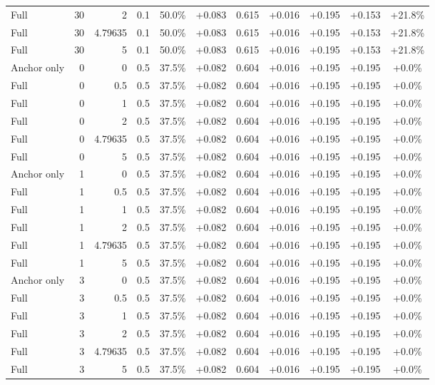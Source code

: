 \begin{table}[htbp]
\begin{tabular}{lrrrccccccc}
Full & 30 & 2 & 0.1 & 50.0\% & +0.083 & 0.615 & +0.016 & +0.195 & +0.153 & +21.8\% \\
Full & 30 & 4.79635 & 0.1 & 50.0\% & +0.083 & 0.615 & +0.016 & +0.195 & +0.153 & +21.8\% \\
Full & 30 & 5 & 0.1 & 50.0\% & +0.083 & 0.615 & +0.016 & +0.195 & +0.153 & +21.8\% \\
Anchor only & 0 & 0 & 0.5 & 37.5\% & +0.082 & 0.604 & +0.016 & +0.195 & +0.195 & +0.0\% \\
Full & 0 & 0.5 & 0.5 & 37.5\% & +0.082 & 0.604 & +0.016 & +0.195 & +0.195 & +0.0\% \\
Full & 0 & 1 & 0.5 & 37.5\% & +0.082 & 0.604 & +0.016 & +0.195 & +0.195 & +0.0\% \\
Full & 0 & 2 & 0.5 & 37.5\% & +0.082 & 0.604 & +0.016 & +0.195 & +0.195 & +0.0\% \\
Full & 0 & 4.79635 & 0.5 & 37.5\% & +0.082 & 0.604 & +0.016 & +0.195 & +0.195 & +0.0\% \\
Full & 0 & 5 & 0.5 & 37.5\% & +0.082 & 0.604 & +0.016 & +0.195 & +0.195 & +0.0\% \\
Anchor only & 1 & 0 & 0.5 & 37.5\% & +0.082 & 0.604 & +0.016 & +0.195 & +0.195 & +0.0\% \\
Full & 1 & 0.5 & 0.5 & 37.5\% & +0.082 & 0.604 & +0.016 & +0.195 & +0.195 & +0.0\% \\
Full & 1 & 1 & 0.5 & 37.5\% & +0.082 & 0.604 & +0.016 & +0.195 & +0.195 & +0.0\% \\
Full & 1 & 2 & 0.5 & 37.5\% & +0.082 & 0.604 & +0.016 & +0.195 & +0.195 & +0.0\% \\
Full & 1 & 4.79635 & 0.5 & 37.5\% & +0.082 & 0.604 & +0.016 & +0.195 & +0.195 & +0.0\% \\
Full & 1 & 5 & 0.5 & 37.5\% & +0.082 & 0.604 & +0.016 & +0.195 & +0.195 & +0.0\% \\
Anchor only & 3 & 0 & 0.5 & 37.5\% & +0.082 & 0.604 & +0.016 & +0.195 & +0.195 & +0.0\% \\
Full & 3 & 0.5 & 0.5 & 37.5\% & +0.082 & 0.604 & +0.016 & +0.195 & +0.195 & +0.0\% \\
Full & 3 & 1 & 0.5 & 37.5\% & +0.082 & 0.604 & +0.016 & +0.195 & +0.195 & +0.0\% \\
Full & 3 & 2 & 0.5 & 37.5\% & +0.082 & 0.604 & +0.016 & +0.195 & +0.195 & +0.0\% \\
Full & 3 & 4.79635 & 0.5 & 37.5\% & +0.082 & 0.604 & +0.016 & +0.195 & +0.195 & +0.0\% \\
Full & 3 & 5 & 0.5 & 37.5\% & +0.082 & 0.604 & +0.016 & +0.195 & +0.195 & +0.0\% \\

\end{tabular}
\end{table}
